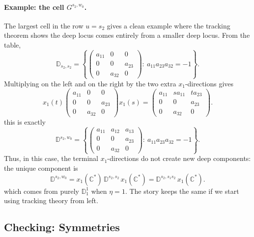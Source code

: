 \documentclass[12pt]{amsart}
\newcommand{\D}{\mathbb D}
\theoremstyle{plain}
\theoremstyle{definition}
\theoremstyle{remark}
\begin{document}
\paragraph{\bf Example: the cell $G^{s_2,w_0}$.}
The largest cell in the row $u=s_2$ gives a clean example where the tracking theorem shows the deep locus
comes entirely from a smaller deep locus. From the table,
\begin{equation*}
\D_{s_2,s_2}
=
\left\{
\begin{pmatrix}
a_{11}&0&0\\
0&0&a_{23}\\
0&a_{32}&0
\end{pmatrix}
:\ a_{11}a_{23}a_{32}=-1
\right\}.
\end{equation*}
Multiplying on the left and on the right by the two extra $x_1$-directions gives
\begin{equation*}
x_1(t)
\begin{pmatrix}
a_{11}&0&0\\
0&0&a_{23}\\
0&a_{32}&0
\end{pmatrix}
x_1(s)
=
\begin{pmatrix}
a_{11}&s a_{11}&t a_{23}\\
0&0&a_{23}\\
0&a_{32}&0
\end{pmatrix}.
\end{equation*}
this is exactly
\begin{equation*}
\D^{s_2,w_0}
=
\left\{
\begin{pmatrix}
a_{11}&a_{12}&a_{13}\\
0&0&a_{23}\\
0&a_{32}&0
\end{pmatrix}
:\ a_{11}a_{23}a_{32}=-1
\right\}.
\end{equation*}
Thus, in this case, the terminal $x_1$-directions do not create new deep
components: the unique component is
\begin{equation*}
   \D^{s_2,w_0}
   =
   x_1(\mathbb C^\ast)\,\D^{s_2,s_2}\,x_1(\mathbb C^\ast)
   =
   \D^{s_2,s_1s_2}\,x_1(\mathbb C^\ast).
\end{equation*}
which comes from purely $\D^1_1$ when $\eta=1$. The story keeps the same if we start using tracking theory from left.



\subsection{Checking: Symmetries}
\end{document}

